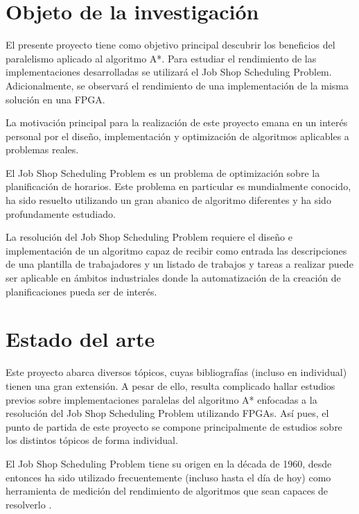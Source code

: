 
\section{Objeto de la investigación}

El presente proyecto tiene como objetivo principal descubrir los
beneficios del paralelismo aplicado al algoritmo A*.
Para estudiar el rendimiento de las implementaciones desarrolladas
se utilizará el Job Shop Scheduling Problem.
Adicionalmente, se observará el rendimiento de una implementación
de la misma solución en una FPGA.

La motivación principal para la realización de este proyecto
emana en un interés personal por el diseño, implementación y optimización
de algoritmos aplicables a problemas reales.

El Job Shop Scheduling Problem es un problema de optimización
sobre la planificación de horarios.
Este problema en particular es mundialmente conocido,
ha sido resuelto utilizando un gran abanico de algoritmo diferentes
y ha sido profundamente estudiado.

La resolución del Job Shop Scheduling Problem requiere el diseño e implementación de
un algoritmo capaz de recibir como entrada las descripciones de una plantilla
de trabajadores y un listado de trabajos y tareas a realizar puede ser
aplicable en ámbitos industriales donde la automatización de la creación
de planificaciones pueda ser de interés.

\pagebreak

\section{Estado del arte}

Este proyecto abarca diversos tópicos, cuyas bibliografías
(incluso en individual) tienen una gran extensión.
A pesar de ello, resulta complicado hallar estudios previos sobre implementaciones
paralelas del algoritmo A* enfocadas a la resolución del Job Shop Scheduling Problem
utilizando FPGAs.
Así pues, el punto de partida de este proyecto
se compone principalmente de estudios
sobre los distintos tópicos de forma individual.

El Job Shop Scheduling Problem tiene su origen en la década de 1960,
desde entonces ha sido utilizado frecuentemente (incluso hasta el día de hoy)
como herramienta de medición del rendimiento de algoritmos que sean 
capaces de resolverlo \cite{Man67}.

